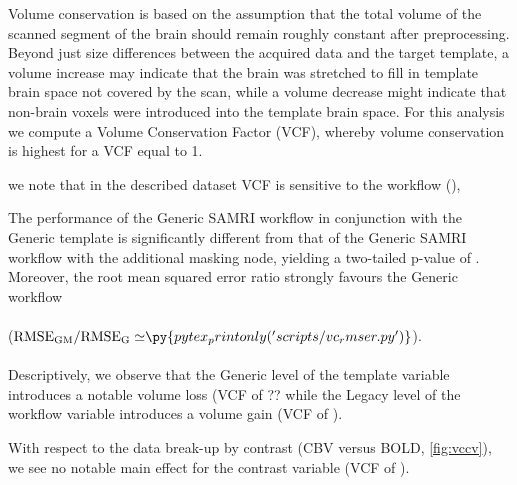 Volume conservation is based on the assumption that the total volume of the scanned segment of the brain should remain roughly constant after preprocessing.
Beyond just size differences between the acquired data and the target template, a volume increase may indicate that the brain was stretched to fill in template brain space not covered by the scan, while a volume decrease might indicate that non-brain voxels were introduced into the template brain space.
For this analysis we compute a Volume Conservation Factor (VCF), whereby volume conservation is highest for a VCF equal to 1.

we note that in the described dataset VCF is sensitive to
the workflow (),

The performance of the Generic SAMRI workflow in conjunction with the Generic template is significantly different from that of the Generic SAMRI workflow with the additional masking node, yielding a two-tailed p-value of .
Moreover, the root mean squared error ratio strongly favours the Generic workflow
\\
\\
($\mathrm{RMSE_{GM}/RMSE_{G}\simeq} \py{pytex_printonly('scripts/vc_rmser.py')}$).
\\
\\


Descriptively, we observe that the Generic level of the template variable introduces a notable volume loss
(VCF of  ?? %
while the Legacy level of the workflow variable introduces a volume gain
(VCF of ).



With respect to the data break-up by contrast (CBV versus BOLD, \cref{fig:vccv}), we see no notable main effect for the contrast variable
(VCF of ).



